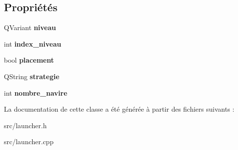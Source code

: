 \subsection*{Propriétés}
\begin{DoxyCompactItemize}
\item 
Q\+Variant {\bfseries niveau}\hypertarget{class_launcher_a5a179c1054360e4a9ed4ed7ab68bc669}{}\label{class_launcher_a5a179c1054360e4a9ed4ed7ab68bc669}

\item 
int {\bfseries index\+\_\+niveau}\hypertarget{class_launcher_a3d11ce16022d3be36e2d08d16bce7a20}{}\label{class_launcher_a3d11ce16022d3be36e2d08d16bce7a20}

\item 
bool {\bfseries placement}\hypertarget{class_launcher_a66757e33dc479289c6717e0026013827}{}\label{class_launcher_a66757e33dc479289c6717e0026013827}

\item 
Q\+String {\bfseries strategie}\hypertarget{class_launcher_a6c6261cfe4560a48e66f9144613098b6}{}\label{class_launcher_a6c6261cfe4560a48e66f9144613098b6}

\item 
int {\bfseries nombre\+\_\+navire}\hypertarget{class_launcher_a6171d66a1fbd1595dd4340bf06a35260}{}\label{class_launcher_a6171d66a1fbd1595dd4340bf06a35260}

\end{DoxyCompactItemize}


La documentation de cette classe a été générée à partir des fichiers suivants \+:\begin{DoxyCompactItemize}
\item 
src/launcher.\+h\item 
src/launcher.\+cpp\end{DoxyCompactItemize}
